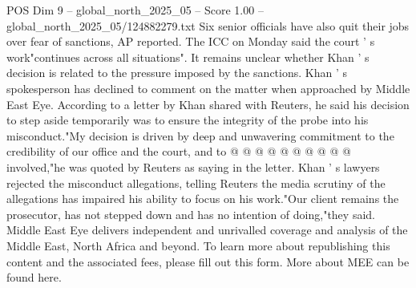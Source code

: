 \begin{textsample}{POS Dim 9 – global\_north\_2025\_05 – Score 1.00 – global\_north\_2025\_05/124882279.txt}
Six senior officials have also quit their jobs over fear of sanctions, AP reported.
The ICC on Monday said the court ' s work"continues across all situations".
It remains unclear whether Khan ' s decision is related to the pressure imposed by the sanctions.
Khan ' s spokesperson has declined to comment on the matter when approached by Middle East Eye.
According to a letter by Khan shared with Reuters, he said his decision to step aside temporarily was to ensure the integrity of the probe into his misconduct."My decision is driven by deep and unwavering commitment to the credibility of our office and the court, and to @ @ @ @ @ @ @ @ @ @ involved,"he was quoted by Reuters as saying in the letter.
Khan ' s lawyers rejected the misconduct allegations, telling Reuters the media scrutiny of the allegations has impaired his ability to focus on his work."Our client remains the prosecutor, has not stepped down and has no intention of doing,"they said.
Middle East Eye delivers independent and unrivalled coverage and analysis of the Middle East, North Africa and beyond.
To learn more about republishing this content and the associated fees, please fill out this form.
More about MEE can be found here.

\end{textsample}
